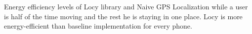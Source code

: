 Energy efficiency levels of Locy library and Naive GPS Localization while a user is half of the time moving and the rest he is staying in one place. Locy is more energy-efficient than baseline implementation for every phone.
